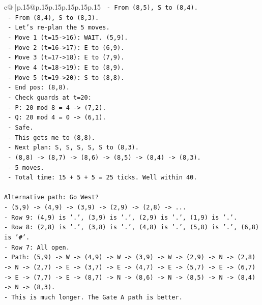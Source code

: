 \documentclass{article}
\begin{document}
{\begin{supertabular}{c@{$\;$}|p{.15\linewidth}@{}p{.15\linewidth}p{.15\linewidth}p{.15\linewidth}p{.15\linewidth}p{.15\linewidth}}
{{{\texttt{         {-} From (8,5), S to (8,4).} \\
\texttt{         {-} From (8,4), S to (8,3).} \\
\texttt{       {-} Let's re{-}plan the 5 moves.} \\
\texttt{       {-} Move 1 (t=15{-}>16): WAIT. (5,9).} \\
\texttt{       {-} Move 2 (t=16{-}>17): E to (6,9).} \\
\texttt{       {-} Move 3 (t=17{-}>18): E to (7,9).} \\
\texttt{       {-} Move 4 (t=18{-}>19): E to (8,9).} \\
\texttt{       {-} Move 5 (t=19{-}>20): S to (8,8).} \\
\texttt{       {-} End pos: (8,8).} \\
\texttt{       {-} Check guards at t=20:} \\
\texttt{         {-} P: 20 mod 8 = 4 {-}> (7,2).} \\
\texttt{         {-} Q: 20 mod 4 = 0 {-}> (6,1).} \\
\texttt{         {-} Safe.} \\
\texttt{       {-} This gets me to (8,8).} \\
\texttt{       {-} Next plan: S, S, S, S, S to (8,3).} \\
\texttt{       {-} (8,8) {-}> (8,7) {-}> (8,6) {-}> (8,5) {-}> (8,4) {-}> (8,3).} \\
\texttt{       {-} 5 moves.} \\
\texttt{       {-} Total time: 15 + 5 + 5 = 25 ticks. Well within 40.} \\
\\ 
\texttt{Alternative path: Go West?} \\
\texttt{{-} (5,9) {-}> (4,9) {-}> (3,9) {-}> (2,9) {-}> (2,8) {-}> ...} \\
\texttt{{-} Row 9: (4,9) is '.', (3,9) is '.', (2,9) is '.', (1,9) is '.'.} \\
\texttt{{-} Row 8: (2,8) is '.', (3,8) is '.', (4,8) is '.', (5,8) is '.', (6,8) is '\#'.} \\
\texttt{{-} Row 7: All open.} \\
\texttt{{-} Path: (5,9) {-}> W {-}> (4,9) {-}> W {-}> (3,9) {-}> W {-}> (2,9) {-}> N {-}> (2,8) {-}> N {-}> (2,7) {-}> E {-}> (3,7) {-}> E {-}> (4,7) {-}> E {-}> (5,7) {-}> E {-}> (6,7) {-}> E {-}> (7,7) {-}> E {-}> (8,7) {-}> N {-}> (8,6) {-}> N {-}> (8,5) {-}> N {-}> (8,4) {-}> N {-}> (8,3).} \\
\texttt{{-} This is much longer. The Gate A path is better.} \\
}}}
\end{supertabular}}
\end{document}
